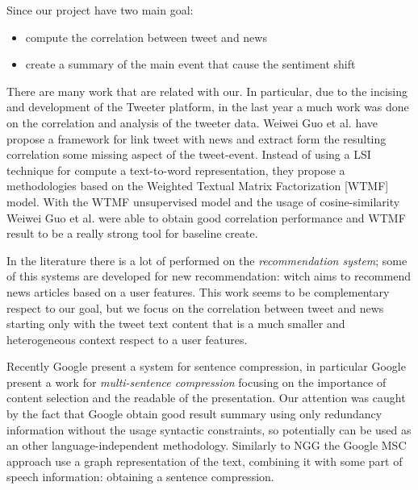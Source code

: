 Since our project have two main goal:
\begin{itemize}
	\item compute the correlation between tweet and news
	\item create a summary of the main event that cause the sentiment shift
\end{itemize}
There are many work that are related with our. 
In particular, due to the incising and development of the Tweeter platform, in the last year a much work was done on the correlation and analysis of the tweeter data. Weiwei Guo et al.\cite{LTN} have propose a framework for link tweet with news and extract form the resulting correlation some missing aspect of the tweet-event. Instead of using a LSI technique for compute a text-to-word representation, they propose a methodologies based on the Weighted Textual Matrix Factorization\cite{WTMF} [WTMF] model. With the WTMF unsupervised model and the usage of cosine-similarity Weiwei Guo et al. were able to obtain good correlation performance and WTMF result to be a really strong tool for baseline create.

In the literature there is a lot of performed on the \emph{recommendation system}; some of this systems are developed for new recommendation: witch aims to recommend news articles based on a user features. This work seems to be complementary respect to our goal, but we focus on the correlation between tweet and news starting only with the tweet text content that is a much smaller and heterogeneous context respect to a user features. 

Recently Google present a system for sentence compression, in particular Google present a work for \emph{multi-sentence compression}\cite{MSC} focusing on the importance of content selection and the readable of the presentation.
Our attention was caught by the fact that Google obtain good result summary using only redundancy information without the usage syntactic constraints, so potentially can be used as an other language-independent methodology. Similarly to NGG the Google MSC approach use a graph representation of the text, combining it with some part of speech  information: obtaining a sentence compression.

